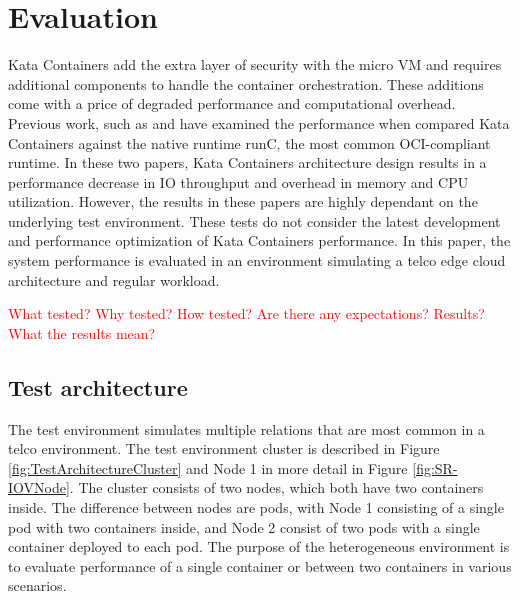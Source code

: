 \chapter{Evaluation}
\label{chapter:evaluation}

Kata Containers add the extra layer of security with the micro VM and requires additional components to handle the container orchestration. These additions come with a price of degraded performance and computational overhead. Previous work, such as \cite{Kumar2020} and \cite{EverartsdeVelp2020} have examined the performance when compared Kata Containers against the native runtime runC, the most common OCI-compliant runtime. In these two papers, Kata Containers architecture design results in a performance decrease in IO throughput and overhead in memory and CPU utilization. However, the results in these papers are highly dependant on the underlying test environment. These tests do not consider the latest development and performance optimization of Kata Containers performance. In this paper, the system performance is evaluated in an environment simulating a telco edge cloud architecture and regular workload.

\textcolor{red}{What tested?}
\textcolor{red}{Why tested?}
\textcolor{red}{How tested?}
\textcolor{red}{Are there any expectations?}
\textcolor{red}{Results?}
\textcolor{red}{What the results mean?}

\section{Test architecture}
\label{section:test_architecture}

The test environment simulates multiple relations that are most common in a telco environment. The test environment cluster is described in Figure \ref{fig:TestArchitectureCluster} and Node 1 in more detail in Figure \ref{fig:SR-IOVNode}. The cluster consists of two nodes, which both have two containers inside. The difference between nodes are pods, with Node 1 consisting of a single pod with two containers inside, and Node 2 consist of two pods with a single container deployed to each pod. The purpose of the heterogeneous environment is to evaluate performance of a single container or between two containers in various scenarios.


